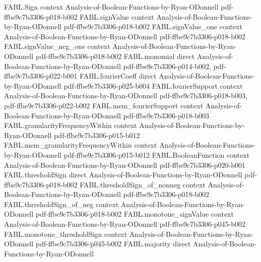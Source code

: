 \begin{theorem}
\label{FABL.recursiveMajority_monotone}
\leanok
{}
\proofstep
  {FABL.Sign}
  {context}
  {Analysis-of-Boolean-Functions-by-Ryan-ODonnell}
  {pdf-ffbe9c7b3306-p018-b002}
\proofstep
  {FABL.signValue}
  {context}
  {Analysis-of-Boolean-Functions-by-Ryan-ODonnell}
  {pdf-ffbe9c7b3306-p018-b002}
\proofstep
  {FABL.signValue_one}
  {context}
  {Analysis-of-Boolean-Functions-by-Ryan-ODonnell}
  {pdf-ffbe9c7b3306-p018-b002}
\proofstep
  {FABL.signValue_neg_one}
  {context}
  {Analysis-of-Boolean-Functions-by-Ryan-ODonnell}
  {pdf-ffbe9c7b3306-p018-b002}
\proofstep
  {FABL.monomial}
  {direct}
  {Analysis-of-Boolean-Functions-by-Ryan-ODonnell}
  {pdf-ffbe9c7b3306-p014-b002,
    pdf-ffbe9c7b3306-p022-b001}
\proofstep
  {FABL.fourierCoeff}
  {direct}
  {Analysis-of-Boolean-Functions-by-Ryan-ODonnell}
  {pdf-ffbe9c7b3306-p025-b004}
\proofstep
  {FABL.fourierSupport}
  {context}
  {Analysis-of-Boolean-Functions-by-Ryan-ODonnell}
  {pdf-ffbe9c7b3306-p018-b003,
    pdf-ffbe9c7b3306-p022-b002}
\proofstep
  {FABL.mem_fourierSupport}
  {context}
  {Analysis-of-Boolean-Functions-by-Ryan-ODonnell}
  {pdf-ffbe9c7b3306-p018-b003}
\proofstep
  {FABL.granularityFrequencyWithin}
  {context}
  {Analysis-of-Boolean-Functions-by-Ryan-ODonnell}
  {pdf-ffbe9c7b3306-p015-b012}
\proofstep
  {FABL.mem_granularityFrequencyWithin}
  {context}
  {Analysis-of-Boolean-Functions-by-Ryan-ODonnell}
  {pdf-ffbe9c7b3306-p015-b012}
\proofstep
  {FABL.BooleanFunction}
  {context}
  {Analysis-of-Boolean-Functions-by-Ryan-ODonnell}
  {pdf-ffbe9c7b3306-p020-b001}
\proofstep
  {FABL.thresholdSign}
  {direct}
  {Analysis-of-Boolean-Functions-by-Ryan-ODonnell}
  {pdf-ffbe9c7b3306-p018-b002}
\proofstep
  {FABL.thresholdSign_of_nonneg}
  {context}
  {Analysis-of-Boolean-Functions-by-Ryan-ODonnell}
  {pdf-ffbe9c7b3306-p018-b002}
\proofstep
  {FABL.thresholdSign_of_neg}
  {context}
  {Analysis-of-Boolean-Functions-by-Ryan-ODonnell}
  {pdf-ffbe9c7b3306-p018-b002}
\proofstep
  {FABL.monotone_signValue}
  {context}
  {Analysis-of-Boolean-Functions-by-Ryan-ODonnell}
  {pdf-ffbe9c7b3306-p045-b002}
\proofstep
  {FABL.monotone_thresholdSign}
  {context}
  {Analysis-of-Boolean-Functions-by-Ryan-ODonnell}
  {pdf-ffbe9c7b3306-p045-b002}
\proofstep
  {FABL.majority}
  {direct}
  {Analysis-of-Boolean-Functions-by-Ryan-ODonnell}

\end{theorem}
